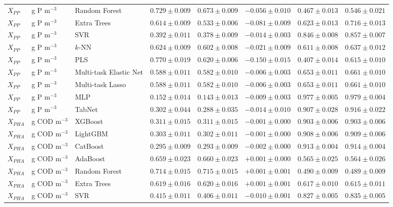\begin{longtable}{llp{3.1cm}rrrrr}
$X_{PP}$ & g P m$^{-3}$ & Random Forest & $0.729\pm0.009$ & $0.673\pm0.009$ & $-0.056\pm0.010$ & $0.467\pm0.013$ & $0.546\pm0.021$ \\
$X_{PP}$ & g P m$^{-3}$ & Extra Trees & $0.614\pm0.009$ & $0.533\pm0.006$ & $-0.081\pm0.009$ & $0.623\pm0.013$ & $0.716\pm0.013$ \\
$X_{PP}$ & g P m$^{-3}$ & SVR & $0.392\pm0.011$ & $0.378\pm0.009$ & $-0.014\pm0.003$ & $0.846\pm0.008$ & $0.857\pm0.007$ \\
$X_{PP}$ & g P m$^{-3}$ & $k$-NN & $0.624\pm0.009$ & $0.602\pm0.008$ & $-0.021\pm0.009$ & $0.611\pm0.008$ & $0.637\pm0.012$ \\
$X_{PP}$ & g P m$^{-3}$ & PLS & $0.770\pm0.019$ & $0.620\pm0.006$ & $-0.150\pm0.015$ & $0.407\pm0.014$ & $0.615\pm0.010$ \\
$X_{PP}$ & g P m$^{-3}$ & Multi-task Elastic Net & $0.588\pm0.011$ & $0.582\pm0.010$ & $-0.006\pm0.003$ & $0.653\pm0.011$ & $0.661\pm0.010$ \\
$X_{PP}$ & g P m$^{-3}$ & Multi-task Lasso & $0.588\pm0.011$ & $0.582\pm0.010$ & $-0.006\pm0.003$ & $0.653\pm0.011$ & $0.661\pm0.010$ \\
$X_{PP}$ & g P m$^{-3}$ & MLP & $0.152\pm0.014$ & $0.143\pm0.013$ & $-0.009\pm0.003$ & $0.977\pm0.005$ & $0.979\pm0.004$ \\
$X_{PP}$ & g P m$^{-3}$ & TabNet & $0.302\pm0.044$ & $0.288\pm0.035$ & $-0.014\pm0.010$ & $0.907\pm0.028$ & $0.916\pm0.022$ \\
$X_{PHA}$ & g COD m$^{-3}$ & XGBoost & $0.311\pm0.015$ & $0.311\pm0.015$ & $-0.001\pm0.000$ & $0.903\pm0.006$ & $0.903\pm0.006$ \\
$X_{PHA}$ & g COD m$^{-3}$ & LightGBM & $0.303\pm0.011$ & $0.302\pm0.011$ & $-0.001\pm0.000$ & $0.908\pm0.006$ & $0.909\pm0.006$ \\
$X_{PHA}$ & g COD m$^{-3}$ & CatBoost & $0.295\pm0.009$ & $0.293\pm0.009$ & $-0.002\pm0.000$ & $0.913\pm0.004$ & $0.914\pm0.004$ \\
$X_{PHA}$ & g COD m$^{-3}$ & AdaBoost & $0.659\pm0.023$ & $0.660\pm0.023$ & $+0.001\pm0.000$ & $0.565\pm0.025$ & $0.564\pm0.026$ \\
$X_{PHA}$ & g COD m$^{-3}$ & Random Forest & $0.714\pm0.015$ & $0.715\pm0.015$ & $+0.001\pm0.001$ & $0.490\pm0.009$ & $0.489\pm0.009$ \\
$X_{PHA}$ & g COD m$^{-3}$ & Extra Trees & $0.619\pm0.016$ & $0.620\pm0.016$ & $+0.001\pm0.001$ & $0.617\pm0.010$ & $0.615\pm0.011$ \\
$X_{PHA}$ & g COD m$^{-3}$ & SVR & $0.415\pm0.011$ & $0.406\pm0.011$ & $-0.010\pm0.001$ & $0.827\pm0.005$ & $0.835\pm0.005$ \\

\end{longtable}
